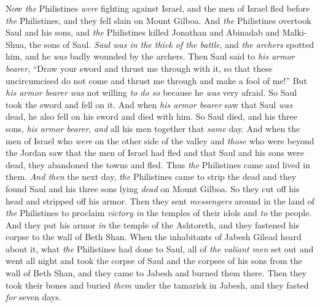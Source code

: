 \begin{biblechapter} %
 Now \textit{the} Philistines \textit{were} fighting against Israel, and the men of Israel fled before \textit{the} Philistines, and they fell slain on Mount Gilboa.
\verse And \textit{the} Philistines overtook Saul and his sons, and \textit{the} Philistines killed Jonathan and Abinadab and Malki-Shua, the sons of Saul.
\verse \textit{Saul was in the thick of the battle}, and \textit{the archers} spotted him, and he \textit{was} badly wounded by the archers.
\verse Then Saul said to \textit{his armor bearer}, “Draw your sword and thrust me through with it, so that these uncircumcised do not come and thrust me through and make a fool of me!” But \textit{his armor bearer} \textit{was} not willing \textit{to do so} because he \textit{was} very afraid. So Saul took the sword and fell on it.
\verse And when \textit{his armor bearer} saw that Saul \textit{was} dead, he also fell on his sword and died with him.
\verse So Saul died, and his three sons, \textit{his armor bearer}, \textit{and} all his men together that \textit{same} day.
\verse And when the men of Israel who \textit{were} on the other side of the valley and \textit{those} who were beyond the Jordan saw that the men of Israel had fled and that Saul and his sons were dead, they abandoned the towns and fled. Thus \textit{the} Philistines came and lived in them.
\verse \textit{And then} the next day, \textit{the} Philistines came to strip the dead and they found Saul and his three sons lying \textit{dead} on Mount Gilboa.
\verse So they cut off his head and stripped off his armor. Then they sent \textit{messengers} around in the land of \textit{the} Philistines to proclaim \textit{victory in} the temples of their idols and \textit{to} the people.
\verse And they put his armor \textit{in} the temple of the Ashtoreth, and they fastened his corpse to the wall of Beth Shan.
\verse When the inhabitants of Jabesh Gilead heard about it, what \textit{the} Philistines had done to Saul,
\verse all of \textit{the valiant men} set out and went all night and took the corpse of Saul and the corpses of his sons from the wall of Beth Shan, and they came to Jabesh and burned them there.
\verse Then they took their bones and buried \textit{them} under the tamarisk in Jabesh, and they fasted \textit{for} seven days.
\end{biblechapter}

